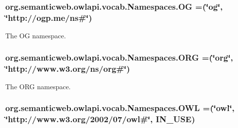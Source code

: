 \hypertarget{enumorg_1_1semanticweb_1_1owlapi_1_1vocab_1_1_namespaces_a5df618b6b0ec7922482cdd90491d1940}{
\subsubsection[{O\-G}]{\setlength{\rightskip}{0pt plus 5cm}org.\-semanticweb.\-owlapi.\-vocab.\-Namespaces.\-O\-G =(\char`\"{}og\char`\"{}, \char`\"{}http\-://ogp.\-me/{\bf ns}\#\char`\"{})}}\label{enumorg_1_1semanticweb_1_1owlapi_1_1vocab_1_1_namespaces_a5df618b6b0ec7922482cdd90491d1940}
The O\-G namespace. \hypertarget{enumorg_1_1semanticweb_1_1owlapi_1_1vocab_1_1_namespaces_a9b9a9e25538e7b9d7a2233ce857ac8a9}{
\subsubsection[{O\-R\-G}]{\setlength{\rightskip}{0pt plus 5cm}org.\-semanticweb.\-owlapi.\-vocab.\-Namespaces.\-O\-R\-G =(\char`\"{}org\char`\"{}, \char`\"{}http\-://www.\-w3.\-org/{\bf ns}/org\#\char`\"{})}}\label{enumorg_1_1semanticweb_1_1owlapi_1_1vocab_1_1_namespaces_a9b9a9e25538e7b9d7a2233ce857ac8a9}
The O\-R\-G namespace. \hypertarget{enumorg_1_1semanticweb_1_1owlapi_1_1vocab_1_1_namespaces_a2fcb537074d9307ef1356ffb6a5bd6f4}{
\subsubsection[{O\-W\-L}]{\setlength{\rightskip}{0pt plus 5cm}org.\-semanticweb.\-owlapi.\-vocab.\-Namespaces.\-O\-W\-L =(\char`\"{}owl\char`\"{}, \char`\"{}http\-://www.\-w3.\-org/2002/07/owl\#\char`\"{}, I\-N\-\_\-\-U\-S\-E)}}\label{enumorg_1_1semanticweb_1_1owlapi_1_1vocab_1_1_namespaces_a2fcb537074d9307ef1356ffb6a5bd6f4}
